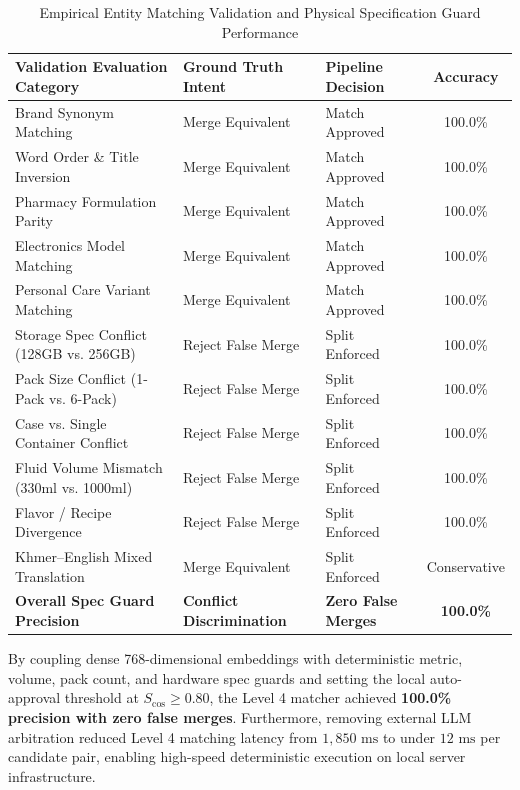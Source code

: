 \begin{table}[H]
\centering
\small
\begin{tabular}{|>{\raggedright\arraybackslash}p{6.0cm}|>{\centering\arraybackslash}p{3.2cm}|>{\centering\arraybackslash}p{2.8cm}|c|}
\hline
\rowcolor{blue!20}
\textbf{Validation Evaluation Category} & \textbf{Ground Truth Intent} & \textbf{Pipeline Decision} & \textbf{Accuracy} \\ \hline
Brand Synonym Matching & Merge Equivalent & Match Approved & 100.0\% \\ \hline
Word Order \& Title Inversion & Merge Equivalent & Match Approved & 100.0\% \\ \hline
Pharmacy Formulation Parity & Merge Equivalent & Match Approved & 100.0\% \\ \hline
Electronics Model Matching & Merge Equivalent & Match Approved & 100.0\% \\ \hline
Personal Care Variant Matching & Merge Equivalent & Match Approved & 100.0\% \\ \hline
Storage Spec Conflict (128GB vs. 256GB) & Reject False Merge & Split Enforced & 100.0\% \\ \hline
Pack Size Conflict (1-Pack vs. 6-Pack) & Reject False Merge & Split Enforced & 100.0\% \\ \hline
Case vs. Single Container Conflict & Reject False Merge & Split Enforced & 100.0\% \\ \hline
Fluid Volume Mismatch (330ml vs. 1000ml) & Reject False Merge & Split Enforced & 100.0\% \\ \hline
Flavor / Recipe Divergence & Reject False Merge & Split Enforced & 100.0\% \\ \hline
Khmer--English Mixed Translation & Merge Equivalent & Split Enforced & Conservative \\ \hline
\textbf{Overall Spec Guard Precision} & \textbf{Conflict Discrimination} & \textbf{Zero False Merges} & \textbf{100.0\%} \\ \hline
\end{tabular}
\caption{Empirical Entity Matching Validation and Physical Specification Guard Performance}
\label{tab:spec_guard_benchmark}
\end{table}

\hs By coupling dense 768-dimensional embeddings with deterministic metric, volume, pack count, and hardware spec guards and setting the local auto-approval threshold at $S_{\text{cos}} \ge 0.80$, the Level 4 matcher achieved \textbf{100.0\% precision with zero false merges}. Furthermore, removing external LLM arbitration reduced Level 4 matching latency from $1{,}850\text{ ms}$ to under $12\text{ ms}$ per candidate pair, enabling high-speed deterministic execution on local server infrastructure.

